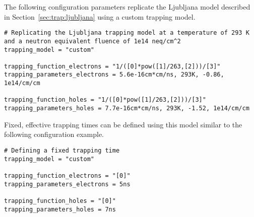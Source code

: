 The following configuration parameters replicate the Ljubljana model described in Section~\ref{sec:trap:ljubljana} using a custom trapping model.
\begin{verbatim}
# Replicating the Ljubljana trapping model at a temperature of 293 K and a neutron equivalent fluence of 1e14 neq/cm^2
trapping_model = "custom"

trapping_function_electrons = "1/([0]*pow([1]/263,[2]))/[3]"
trapping_parameters_electrons = 5.6e-16cm*cm/ns, 293K, -0.86, 1e14/cm/cm

trapping_function_holes = "1/([0]*pow([1]/263,[2]))/[3]"
trapping_parameters_holes = 7.7e-16cm*cm/ns, 293K, -1.52, 1e14/cm/cm
\end{verbatim}

Fixed, effective trapping times can be defined using this model similar to the following configuration example.
\begin{verbatim}
# Defining a fixed trapping time
trapping_model = "custom"

trapping_function_electrons = "[0]"
trapping_parameters_electrons = 5ns

trapping_function_holes = "[0]"
trapping_parameters_holes = 7ns
\end{verbatim}
